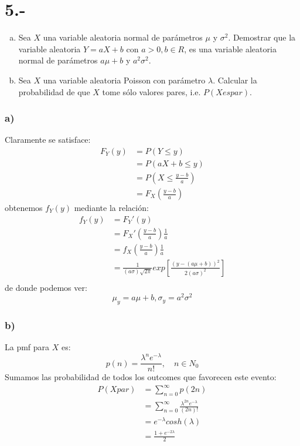 \documentclass{article}
\begin{document}
\section*{5.-}
\begin{enumerate}[a)]    
    \item Sea $X$ una variable aleatoria normal de parámetros $\mu$ y $\sigma^2$. Demostrar que la variable aleatoria $Y = aX+b$ con $a>0,b\in R$, 
    es una variable aleatoria normal de parámetros $a\mu +b$ y $a^2\sigma^2$.
    \item Sea $X$ una variable aleatoria Poisson con parámetro $\lambda$. Calcular la probabilidad de que $X$ tome sólo valores pares, i.e. $P(X es par)$.
\end{enumerate}
\begin{tcolorbox}[breakable]
    \subsubsection*{a)}
    Claramente se satisface:
    \begin{align*}
        F_Y(y) 
        &= P(Y \leq y) \\
        &= P(aX+b \leq y) \\
        &= P(X \leq \tfrac{y-b}{a}) \\
        &= F_X(\tfrac{y-b}{a})
    \end{align*}
    obtenemos $f_Y(y)$ mediante la relación:
    \begin{align*}
        f_Y(y) 
        &= F_Y'(y) \\
        &= F_X'(\tfrac{y-b}{a})\tfrac{1}{a} \\
        &= f_X(\tfrac{y-b}{a})\tfrac{1}{a} \\
        &= \tfrac{1}{(a\sigma) \sqrt{2 \pi}}exp\left[{\tfrac{(y-(a\mu+b))^2}{2(a\sigma)^2}}\right] \\
    \end{align*}
    de donde podemos ver:
    \[ \mu_y = a\mu+b, \sigma_y = a^2\sigma^2 \]
    
    \subsubsection*{b)}
    La pmf para $X$ es:
    \[ p(n) = \frac{\lambda^ne^{-\lambda}}{n!}, \quad n \in N_0 \]
    Sumamos las probabilidad de todos los outcomes que favorecen este evento:
    \begin{align*}
        P(X par) 
        &= \sum_{n=0}^\infty p(2n) \\
        &= \sum_{n=0}^\infty \frac{\lambda^{2n}e^{-\lambda}}{(2n)!} \\
        &= e^{-\lambda}cosh(\lambda) \\
        &= \frac{1+e^{-2\lambda}}{2}
    \end{align*}
\end{tcolorbox}
\end{document}

